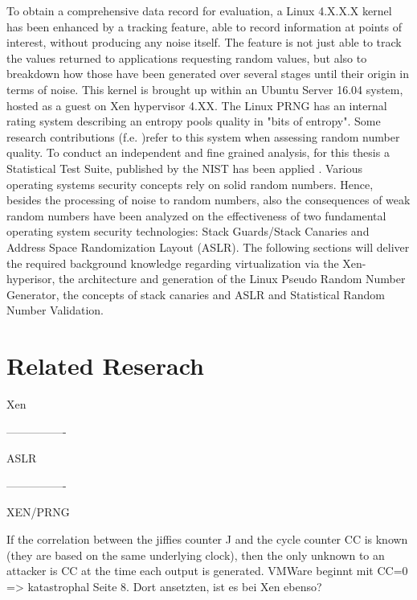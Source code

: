 To obtain a comprehensive data record for evaluation, a Linux 4.X.X.X kernel has been enhanced by a tracking feature, able to record information at points of interest, without producing any noise itself. The feature is not just able to track the values returned to applications requesting random values, but also to breakdown how those have been generated over several stages until their origin in terms of noise. This kernel is brought up within an Ubuntu Server 16.04 system, hosted as a guest on Xen hypervisor 4.XX. The Linux PRNG has an internal rating system describing an entropy pools quality in "bits of entropy". Some research contributions (f.e. \cite{lacharme2012linux})refer to this system when assessing random number quality. To conduct an independent and fine grained analysis, for this thesis a Statistical Test Suite, published by the NIST has been applied \cite{paul2016nist}. Various operating systems security concepts rely on solid random numbers. Hence, besides the processing of noise to random numbers, also the consequences of weak random numbers have been analyzed on the effectiveness of two fundamental operating system security technologies: Stack Guards/Stack Canaries and Address Space Randomization Layout (ASLR).
The following sections will deliver the required background knowledge regarding virtualization via the Xen-hyperisor, the architecture and generation of the Linux Pseudo Random Number Generator, the concepts of stack canaries and ASLR and Statistical Random Number Validation. 



\section{Related Reserach}

Xen

----------------

ASLR

----------------

XEN/PRNG

If the correlation between the jiffies counter J and the cycle counter CC is known (they are based on the same underlying clock), then the only unknown to an attacker is CC at the time each output is generated. \cite{everspaugh2014not} VMWare beginnt mit CC=0 => katastrophal \cite{everspaugh2014not} Seite 8. Dort ansetzten, ist es bei Xen ebenso?












   





